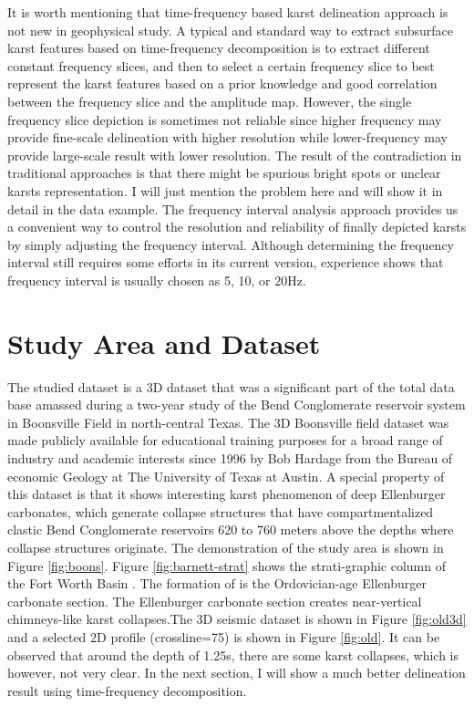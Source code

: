 It is worth mentioning that time-frequency based karst delineation approach is not new in geophysical study. A typical and standard way to extract subsurface karst features based on time-frequency decomposition is to extract different constant frequency slices, and then to select a certain frequency slice to best represent the karst features based on a prior knowledge and good correlation between the frequency slice and the amplitude map. However, the single frequency slice depiction is sometimes not  reliable since higher frequency may provide fine-scale delineation with higher resolution\new{,} while lower-frequency may provide large-scale result with lower resolution. The result of the contradiction in traditional approaches is that there might be spurious bright spots or unclear karsts representation. I will just mention the problem here and will show it in detail in the data example. The frequency interval analysis approach provides us a convenient way to control the resolution and reliability of finally depicted karsts by simply adjusting the frequency interval. Although determining the frequency interval still requires some efforts in its current version,  experience shows that frequency interval is usually chosen as 5, 10, or 20Hz.

\section{Study Area and Dataset}
The studied dataset is a 3D dataset that was a significant part of the total data base amassed during a two-year study of the Bend Conglomerate reservoir system in Boonsville Field in north-central Texas. The 3D Boonsville field dataset  was made publicly available for educational training purposes for a broad range of industry and academic interests since 1996 by Bob Hardage from the Bureau of economic Geology at The University of Texas at Austin. A special property of this dataset is that it shows interesting karst phenomenon of deep Ellenburger carbonates, which generate collapse structures that have compartmentalized clastic Bend Conglomerate reservoirs 620 to 760 meters above the depths where collapse structures originate. The demonstration of the study area is shown in Figure \ref{fig:boons}. Figure \ref{fig:barnett-strat} shows the strati-graphic column of the Fort Worth Basin \cite[]{Pollastro07}. The formation of  is the Ordovician-age Ellenburger carbonate section. The Ellenburger carbonate section creates near-vertical chimneys-like karst collapses.The 3D seismic dataset is shown in Figure \ref{fig:old3d} and a selected 2D profile (crossline=75) is shown in Figure \ref{fig:old}.  It can be observed that around the depth of 1.25s, there are some karst collapses, which is however, not very clear. In the next section, I will show a much better delineation result using time-frequency decomposition. 


